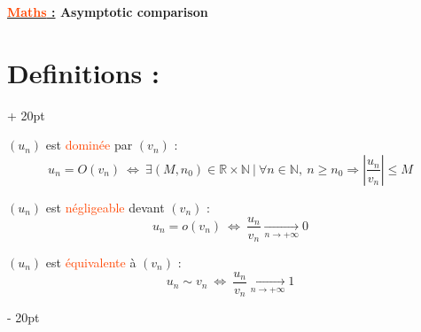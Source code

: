 \documentclass[a4paper, 12pt, twoside]{article}
\renewcommand{\emph}{\textcolor{ff4500}}
\newcommand{\N}{\mathbb{N}} %
\newcommand{\R}{\mathbb{R}} %
\newcommand{\tendsto}[1]{\xrightarrow[#1]{}}
\newcommand{\ssi}{\ \Leftrightarrow \ }
\newcommand{\abs}[1]{\left\lvert #1 \right\rvert} %
\newcommand{\ind}[1][20pt]{\advance\leftskip + #1}
\newcommand{\deind}[1][20pt]{\advance\leftskip - #1}
\newenvironment{indentedenv}[1][20pt]{\par \ind[#1]}{\par \deind}
\newenvironment{indt}[2][20pt]{#2 \begin{indentedenv}[#1]}{\end{indentedenv}} %
\newcommand{\thetitle}[2]{\begin{center}\textbf{{\LARGE \underline{\emph{#1} :}} {\Large #2}}\end{center}}
\begin{document}
    \thetitle{Maths}{Asymptotic comparison}    
    
    
    \begin{indt}{\section{Definitions :}}
        
        $(u_n)$ est \emph{dominée} par $(v_n)$ :
        \vspace{-12pt}
        \[u_n = O(v_n) \ssi \exists (M, n_0) \in \R \times \N\ |\ \forall n \in \N,\ n \ge n_0 \Rightarrow \abs{\dfrac{u_n}{v_n}} \le M \]
        
        \vspace{6pt}
        
        $(u_n)$ est \emph{négligeable} devant $(v_n)$ :
        \vspace{-12pt}
        \[u_n = o(v_n) \ssi \dfrac{u_n}{v_n} \tendsto{n \to +\infty} 0\]
        
        \vspace{6pt}
        
        $(u_n)$ est \emph{équivalente} à $(v_n)$ :
        \vspace{-12pt}
        \[ u_n \sim v_n \ssi \dfrac{u_n}{v_n} \tendsto{n \to +\infty} 1 \]
    
    \end{indt}
    
\end{document}
